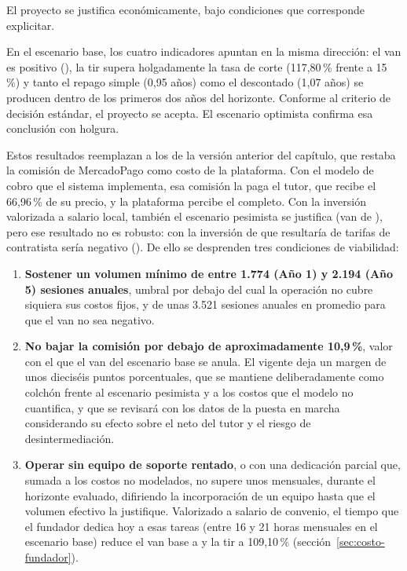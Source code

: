 El proyecto se justifica económicamente, bajo condiciones que corresponde
explicitar.

En el escenario base, los cuatro indicadores apuntan en la misma
dirección: el \gls{van} es positivo (), la \gls{tir} supera
holgadamente la tasa de corte (117,80\,\% frente a 15\,\%) y tanto el
repago simple (0,95 años) como el descontado (1,07 años) se producen
dentro de los primeros dos años del horizonte. Conforme al criterio de
decisión estándar, el proyecto se acepta. El escenario optimista confirma
esa conclusión con holgura.

Estos resultados reemplazan a los de la versión anterior del capítulo,
que restaba la comisión de MercadoPago como costo de la plataforma. Con
el modelo de cobro que el sistema implementa, esa comisión la paga el
tutor, que recibe el 66,96\,\% de su precio, y la plataforma percibe el
\comision{} completo. Con la inversión valorizada a salario local,
también el escenario pesimista se justifica (\gls{van} de ),
pero ese resultado no es robusto: con la inversión de  que
resultaría de tarifas de contratista sería negativo (). De
ello se desprenden tres condiciones de viabilidad:

\begin{enumerate}
    \item \textbf{Sostener un volumen mínimo de entre 1.774 (Año 1) y
          2.194 (Año 5) sesiones anuales}, umbral por debajo del cual la
          operación no cubre siquiera sus costos fijos, y de unas 3.521
          sesiones anuales en promedio para que el \gls{van} no sea
          negativo.
    \item \textbf{No bajar la comisión por debajo de aproximadamente
          10,9\,\%}, valor con el que el \gls{van} del escenario base se
          anula. El \comision{} vigente deja un margen de unos dieciséis
          puntos porcentuales, que se mantiene deliberadamente como
          colchón frente al escenario pesimista y a los costos que el
          modelo no cuantifica, y que se revisará con los datos de la puesta en marcha
          considerando su efecto sobre el neto del tutor y el riesgo de
          desintermediación.
    \item \textbf{Operar sin equipo de soporte rentado}, o con una
          dedicación parcial que, sumada a los costos no modelados, no
          supere unos  mensuales, durante el horizonte evaluado,
          difiriendo la incorporación de un equipo hasta que el volumen
          efectivo la justifique. Valorizado a salario de convenio, el
          tiempo que el fundador dedica hoy a esas tareas (entre 16 y 21
          horas mensuales en el escenario base) reduce el \gls{van} base a
           y la \gls{tir} a 109,10\,\%
          (sección~\ref{sec:costo-fundador}).
\end{enumerate}

